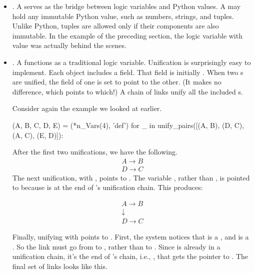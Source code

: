 \begin{itemize}[label=$\bullet$]
\item{}. A  serves as the bridge between logic variables and Python values. A  may hold any immutable Python value, such as numbers, strings, and tuples. Unlike Python, tuples are allowed only if their components are also immutable. In the example of the preceding section, the logic variable  with value  was actually  behind the scenes.
\smallv

\item{}. A  functions as a traditional logic variable. Unification is surprisingly easy to implement. Each  object includes a  field. That field is initially . When two s are unified, the  field of one is set to point to the other. (It makes no difference, which points to which!) A chain of links unify all the included s. 
\smallv

Consider again the example we looked at earlier.
\begin{python}
(A, B, C, D, E) = (*n_Vars(4), 'def')
for _ in unify_pairs([(A, B), (D, C), (A, C), (E, D)]):
\end{python}
After the first two unifications, we have the following.
\begin{equation}\label{eq:one}
\begin{split}
A \rightarrow B \\
D \rightarrow C 
\end{split}
\end{equation}
The next unification,  with , points  to . The variable , rather than , is pointed to  because  is at the end of 's unification chain. This produces:

\begin{equation}\label{eq:two}
\begin{split}
A \rightarrow B \\
\downarrow \\
D \rightarrow C 
\end{split}
\end{equation}

Finally, unifying  with  points  to . First, the system notices that  is a , and  is a . So the link must go from  to , rather than  to . Since  is already in a unification chain, it's the end of 's chain, i.e., , that gets the pointer to . The final set of links looks like this.


\end{itemize}
